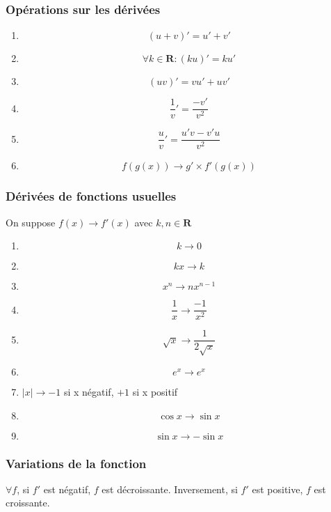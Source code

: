 \documentclass{article}
\begin{document}
\subsubsection{Opérations sur les dérivées}
    \begin{enumerate}
        \item[] $$(u+v)' = u' +v'$$
        \item[] $$\forall k \in \mathbf{R} : (ku)' = ku'$$
        \item[] $$(uv)' = vu' + uv'$$
        \item[] $$\frac{1}{v}' = \frac{-v'}{v^2}$$
        \item[] $$\frac{u}{v}' = \frac{u'v - v'u}{v^2}$$
        \item[] $$f(g(x)) \rightarrow g' \times f'(g(x))$$
    \end{enumerate}

\subsubsection{Dérivées de fonctions usuelles}
    On suppose $f(x) \rightarrow f'(x)$ avec $k,n\in\mathbf{R}$
    \begin{enumerate}
        \item[] $$k \rightarrow 0$$
        \item[] $$kx \rightarrow k$$
        \item[] $$x^n \rightarrow nx^{n-1}$$
        \item[] $$\frac{1}{x} \rightarrow \frac{-1}{x^2}$$
        \item[] $$\sqrt{x} \rightarrow \frac{1}{2\sqrt{x}}$$
        \item[] $$e^x \rightarrow e^x$$
        \item[] \begin{center}
                    $|x| \rightarrow -1$ si x négatif,  $+1$ si x positif
                \end{center}
        \item[] $$\cos{x} \rightarrow \sin{x}$$
        \item[] $$\sin{x} \rightarrow -\sin{x}$$
    \end{enumerate}

\subsubsection{Variations de la fonction}
    $\forall f$, si $f'$ est négatif, $f$ est décroissante. Inversement, si $f'$ est positive, $f$ est croissante.
\end{document}
